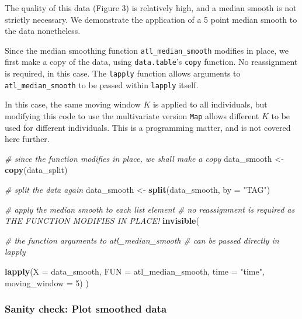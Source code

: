 \documentclass[
]{scrartcl}
\newenvironment{Shaded}{}{}
\newcommand{\CommentTok}[1]{\textcolor[rgb]{0.38,0.63,0.69}{\textit{#1}}}
\newcommand{\DataTypeTok}[1]{\textcolor[rgb]{0.56,0.13,0.00}{#1}}
\newcommand{\DecValTok}[1]{\textcolor[rgb]{0.25,0.63,0.44}{#1}}
\newcommand{\KeywordTok}[1]{\textcolor[rgb]{0.00,0.44,0.13}{\textbf{#1}}}
\newcommand{\NormalTok}[1]{#1}
\newcommand{\StringTok}[1]{\textcolor[rgb]{0.25,0.44,0.63}{#1}}
\begin{document}
The quality of this data (Figure 3) is relatively high, and a median smooth is not strictly necessary. We demonstrate the application of a 5 point median smooth to the data nonetheless.

Since the median smoothing function \texttt{atl\_median\_smooth} modifies in place, we first make a copy of the data, using \texttt{data.table}'s \texttt{copy} function.
No reassignment is required, in this case. The \texttt{lapply} function allows arguments to \texttt{atl\_median\_smooth} to be passed within \texttt{lapply} itself.

In this case, the same moving window \(K\) is applied to all individuals, but modifying this code to use the multivariate version \texttt{Map} allows different \(K\) to be used for different individuals. This is a programming matter, and is not covered here further.

\begin{Shaded}
\begin{Highlighting}[]
\CommentTok{\# since the function modifies in place, we shall make a copy}
\NormalTok{data\_smooth <{-}}\StringTok{ }\KeywordTok{copy}\NormalTok{(data\_split)}

\CommentTok{\# split the data again}
\NormalTok{data\_smooth <{-}}\StringTok{ }\KeywordTok{split}\NormalTok{(data\_smooth, }\DataTypeTok{by =} \StringTok{"TAG"}\NormalTok{)}
\end{Highlighting}
\end{Shaded}

\begin{Shaded}
\begin{Highlighting}[]
\CommentTok{\# apply the median smooth to each list element}
\CommentTok{\# no reassignment is required as THE FUNCTION MODIFIES IN PLACE!}
\KeywordTok{invisible}\NormalTok{(}
  
  \CommentTok{\# the function arguments to atl\_median\_smooth}
  \CommentTok{\# can be passed directly in lapply}
  
  \KeywordTok{lapply}\NormalTok{(}\DataTypeTok{X =}\NormalTok{ data\_smooth, }
         \DataTypeTok{FUN =}\NormalTok{ atl\_median\_smooth,}
         \DataTypeTok{time =} \StringTok{"time"}\NormalTok{, }\DataTypeTok{moving\_window =} \DecValTok{5}\NormalTok{)}
\NormalTok{)}
\end{Highlighting}
\end{Shaded}

\hypertarget{sanity-check-plot-smoothed-data}{%
\subsubsection{Sanity check: Plot smoothed data}\label{sanity-check-plot-smoothed-data}}
\end{document}
